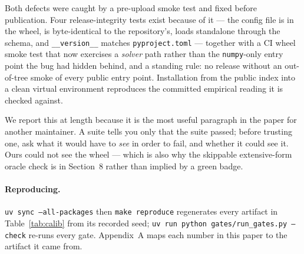 Both defects were caught by a pre-upload smoke test and fixed before publication.
Four release-integrity tests exist because of it --- the config file is in the
wheel, is byte-identical to the repository's, loads standalone through the schema,
and \texttt{\_\_version\_\_} matches \texttt{pyproject.toml} --- together with a
CI wheel smoke test that now exercises a \emph{solver} path rather than the
\texttt{numpy}-only entry point the bug had hidden behind, and a standing rule:
no release without an out-of-tree smoke of every public entry point. Installation
from the public index into a clean virtual environment reproduces the committed
empirical reading it is checked against.

We report this at length because it is the most useful paragraph in the paper for
another maintainer. A suite tells you only that the suite passed; before trusting
one, ask what it would have to \emph{see} in order to fail, and whether it could
see it. Ours could not see the wheel --- which is also why the skippable
extensive-form oracle check is in Section~8 rather than implied by a green badge.

\paragraph{Reproducing.} \texttt{uv sync --all-packages} then \texttt{make
reproduce} regenerates every artifact in Table~\ref{tab:calib} from its recorded
seed; \texttt{uv run python gates/run\_gates.py --check} re-runs every gate.
Appendix~A maps each number in this paper to the artifact it came from.
